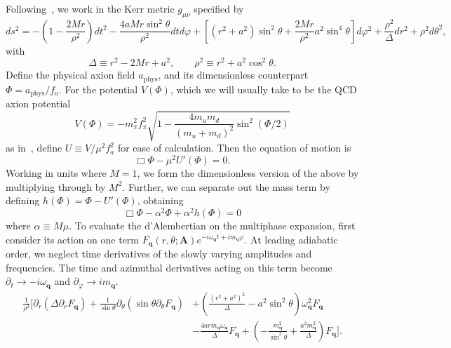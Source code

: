 \documentclass[11pt]{article}
\begin{document}
Following~\cite{Omiya_2022}, we work in the Kerr metric $g_{\mu\nu}$ specified by
\begin{equation}
    ds^2 = - \left(1 - \frac{2Mr}{\rho^2}\right)dt^2 - \frac{4aMr\sin^2\theta}{\rho^2} dt d\varphi + \left[(r^2 + a^2)\sin^2\theta + \frac{2Mr}{\rho^2}a^2 \sin^4\theta\right]d\varphi^2 + \frac{\rho^2}{\Delta}dr^2 + \rho^2 d\theta^2,
\end{equation}
with
\begin{equation}
    \Delta \equiv r^2 - 2Mr + a^2, \qquad \rho^2 \equiv r^2 + a^2 \cos^2 \theta.
\end{equation}
Define the physical axion field $a_\text{phys}$, and its dimensionless counterpart $\Phi = a_\text{phys}/f_a$. For the potential $V(\Phi)$, which we will usually take to be the QCD axion potential
\begin{equation}
    \label{eq:qcd_potential}
    V(\Phi) = -m_\pi^2 f_\pi^2 \sqrt{1 - \frac{4m_um_d}{(m_u+m_d)^2}\sin^2(\Phi/2)}
\end{equation}
as in~\cite{di_Cortona_2016}, define $U \equiv V/\mu^2f_a^2$ for ease of calculation. Then the equation of motion is
\begin{equation}
    \Box \Phi - \mu^2 U'(\Phi) = 0.
\end{equation}
Working in units where $M=1$, we form the dimensionless version of the above by multiplying through by $M^2$. Further, we can separate out the mass term by defining $h(\Phi) = \Phi - U'(\Phi)$, obtaining
\begin{equation}
    \Box\Phi - \alpha^2\Phi + \alpha^2 h(\Phi) = 0
\end{equation}
where $\alpha \equiv M \mu$. To evaluate the d’Alembertian on the multiphase expansion, first consider its action on one term \(F_{\mathbf q}(r,\theta;\mathbf A)e^{-i \omega_\mathbf{q} t + i m_\mathbf{q}\varphi}\). At leading adiabatic order, we neglect time derivatives of the slowly varying amplitudes and frequencies. The time and azimuthal derivatives acting on this term become \(\partial_t\rightarrow-i\omega_{\mathbf q}\) and \(\partial_\varphi\rightarrow im_{\mathbf q}\). 
\begin{equation}
    \label{eq:component_dalembertian}
    \begin{split}
        \frac{1}{\rho^2}\bigg[\partial_r (\Delta \partial_r F_\mathbf{q}) + \frac{1}{\sin \theta} \partial_\theta (\sin \theta \partial_\theta F_\mathbf{q}) &+ \left(\frac{(r^2+a^2)^2}{\Delta} - a^2\sin^2\theta \right) \omega_\mathbf{q}^2F_\mathbf{q} \\
        &- \frac{4arm_\mathbf{q}\omega_\mathbf{q}}{\Delta} F_\mathbf{q} + \left(-\frac{m_\mathbf{q}^2}{\sin^2\theta}+\frac{a^2m_\mathbf{q}^2}{\Delta}\right)F_\mathbf{q}\bigg].
    \end{split}
\end{equation}
\end{document}
